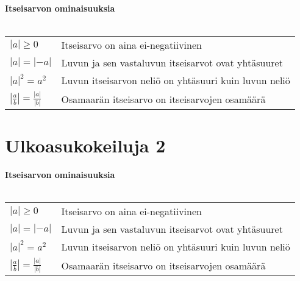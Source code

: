 \newcommand{\laatikkoB}[1]{%
\ifthispageodd
{
  \begin{mdframed}[style=laatikkotyyliB]
    #1
  \end{mdframed}
}
{
  \begin{mdframed}[style=laatikkotyyliC]
    #1
  \end{mdframed}
}
}


\newcommand{\laatikkoE}[1]{%
  \begin{mdframed}[style=laatikkotyyliW]
	#1
  \end{mdframed}
}

\laatikkoE{
\textbf{Itseisarvon ominaisuuksia}\\ \\
	\begin{tabular}{l l}
		$|a|\geq0$ & Itseisarvo on aina ei-negatiivinen \\
		$|a|=|-a|$ & Luvun ja sen vastaluvun itseisarvot ovat yhtäsuuret \\
		$|a|^2=a^2$ & Luvun itseisarvon neliö on yhtäsuuri kuin luvun neliö \\
		$|\frac{a}{b}|=\frac{|a|}{|b|}$ & Osamaarän itseisarvo on itseisarvojen osamäärä

	\end{tabular}
}

\newpage

\section{Ulkoasukokeiluja 2}

\laatikkoE{
\textbf{Itseisarvon ominaisuuksia}\\ \\
	\begin{tabular}{l l}
		$|a|\geq0$ & Itseisarvo on aina ei-negatiivinen \\
		$|a|=|-a|$ & Luvun ja sen vastaluvun itseisarvot ovat yhtäsuuret \\
		$|a|^2=a^2$ & Luvun itseisarvon neliö on yhtäsuuri kuin luvun neliö \\
		$|\frac{a}{b}|=\frac{|a|}{|b|}$ & Osamaarän itseisarvo on itseisarvojen osamäärä

	\end{tabular}
}

\newpage
